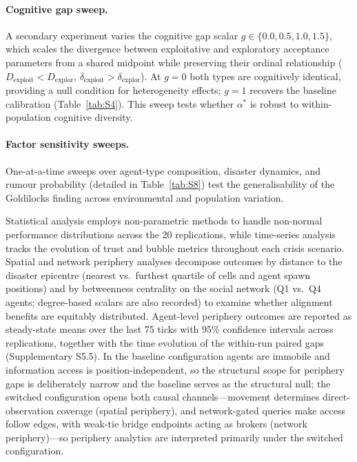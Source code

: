 \paragraph{Cognitive gap sweep.}
A secondary experiment varies the cognitive gap scalar $g\in\{0.0,0.5,1.0,1.5\}$,
which scales the divergence between exploitative and exploratory acceptance
parameters from a shared midpoint while preserving their ordinal relationship
($D_{\mathrm{exploit}}<D_{\mathrm{explor}}$,
$\delta_{\mathrm{exploit}}>\delta_{\mathrm{explor}}$).
At $g=0$ both types are cognitively identical, providing a null condition for
heterogeneity effects; $g=1$ recovers the baseline calibration
(Table~\ref{tab:S4}).
This sweep tests whether $\alpha^*$ is robust to within-population cognitive
diversity.

\paragraph{Factor sensitivity sweeps.}
One-at-a-time sweeps over agent-type composition, disaster dynamics, and rumour
probability (detailed in Table~\ref{tab:S8}) test the generalisability of the
Goldilocks finding across environmental and population variation.

Statistical analysis employs non-parametric methods to handle non-normal
performance distributions across the 20 replications, while time-series analysis
tracks the evolution of trust and bubble metrics throughout each crisis scenario.
Spatial and network periphery analyses decompose outcomes by distance to the
disaster epicentre (nearest vs.\ furthest quartile of cells and agent spawn
positions) and by betweenness centrality on the social network (Q1 vs.\ Q4
agents; degree-based scalars are also recorded) to examine whether alignment
benefits are equitably distributed. Agent-level periphery outcomes are reported
as steady-state means over the last 75 ticks with 95\% confidence intervals
across replications, together with the time evolution of the within-run paired
gaps (Supplementary S5.5).
In the baseline configuration agents are immobile and information access is
position-independent, so the structural scope for periphery gaps is deliberately
narrow and the baseline serves as the structural null; the switched configuration
opens both causal channels---movement determines direct-observation coverage
(spatial periphery), and network-gated queries make access follow edges, with
weak-tie bridge endpoints acting as brokers (network periphery)---so periphery
analytics are interpreted primarily under the switched configuration.

